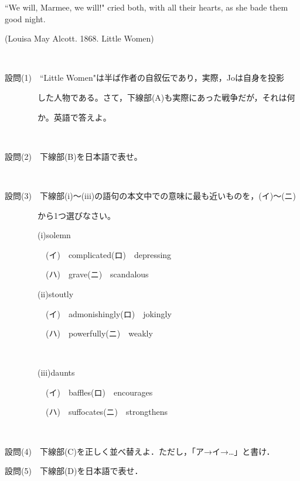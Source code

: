 \documentclass[12pt,a4paper,dvipdfmx]{jarticle}
\begin{document}
\begin{spacing}{1.5}
``We will, Marmee, we will!" cried both, with all their hearts, as she bade them good night.

\vspace{-5mm}\begin{center}
(Louisa May Alcott. 1868. Little Women)
\end{center}\vspace{-5mm}

\

設問(1)　``Little Women"は半ば作者の自叙伝であり，実際，Joは自身を投影

　　　　した人物である。さて，下線部(A)も実際にあった戦争だが，それは何

　　　　か。英語で答えよ。

\

設問(2)　下線部(B)を日本語で表せ。

\

設問(3)　下線部(i)～(iii)の語句の本文中での意味に最も近いものを，(イ)～(ニ)

　　　　から1つ選びなさい。


　　　　(i)\hspace{5mm}solemn

    
　　　　　(イ)　complicated\hspace{20mm}(ロ)　depressing

　　　　　(ハ)　grave\hspace{32mm}(ニ)　scandalous


　　　　(ii)\hspace{5mm}stoutly

    
　　　　　(イ)　admonishingly\hspace{15.5mm}(ロ)　jokingly

　　　　　(ハ)　powerfully\hspace{22.75mm}(ニ)　weakly



\

　　　　(iii)\hspace{5mm}daunts

    
　　　　　(イ)　baffles\hspace{30.5mm}(ロ)　encourages

　　　　　(ハ)　suffocates\hspace{24.5mm}(ニ)　strongthens

\

設問(4)　下線部(C)を正しく並べ替えよ．ただし，「ア→イ→…」と書け．


設問(5)　下線部(D)を日本語で表せ．






\end{spacing}
\end{document}
